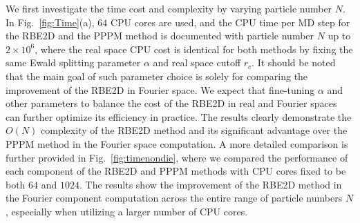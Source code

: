 We first investigate the time cost and complexity by varying particle number $N$. 
In Fig.~\ref{fig:Time}(a), $64$ CPU cores are used, and the  CPU time per MD step for the RBE2D  {and the PPPM method} is documented with particle number $N$ up to $2\times 10^6$, where  {the real space CPU cost is identical for both methods by fixing the same Ewald splitting parameter $\alpha$ and real space cutoff $r_c$}.
 {It should be noted that the main goal of such parameter choice is solely for comparing the improvement of the RBE2D in Fourier space. We expect that fine-tuning $\alpha$ and other parameters to balance the cost of the RBE2D in real and Fourier spaces can further optimize its efficiency in practice.}
The results clearly  {demonstrate} the $O(N)$ complexity of the RBE2D method  {and its significant advantage over the PPPM method in the Fourier space computation.}
 {A more detailed comparison is further provided in Fig.~\ref{fig:timenondie}, where we compared the performance of each component of the RBE2D and PPPM methods with CPU cores fixed to be both $64$ and $1024$. The results show the improvement of the RBE2D method in the Fourier component computation across the entire range of particle numbers $N$, especially when utilizing a larger number of CPU cores.} %



